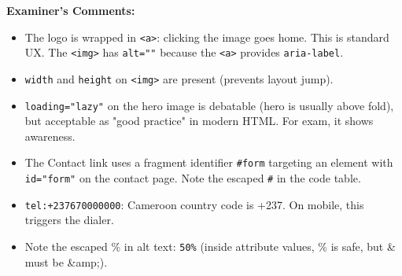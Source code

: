 \documentclass[11pt]{article}
\begin{document}
\begin{exoresolu}
\textbf{Examiner's Comments:}
\begin{itemize}
    \item The logo is wrapped in \texttt{<a>}: clicking the image goes home. This is standard UX. The \texttt{<img>} has \texttt{alt=""} because the \texttt{<a>} provides \texttt{aria-label}.
    \item \texttt{width} and \texttt{height} on \texttt{<img>} are present (prevents layout jump).
    \item \texttt{loading="lazy"} on the hero image is debatable (hero is usually above fold), but acceptable as "good practice" in modern HTML. For exam, it shows awareness.
    \item The Contact link uses a fragment identifier \texttt{\#form} targeting an element with \texttt{id="form"} on the contact page. Note the escaped \texttt{\#} in the code table.
    \item \texttt{tel:+237670000000}: Cameroon country code is +237. On mobile, this triggers the dialer.
    \item Note the escaped \% in alt text: \texttt{50\%} (inside attribute values, \% is safe, but \& must be \&amp;).
\end{itemize}
\end{exoresolu}
\end{document}

